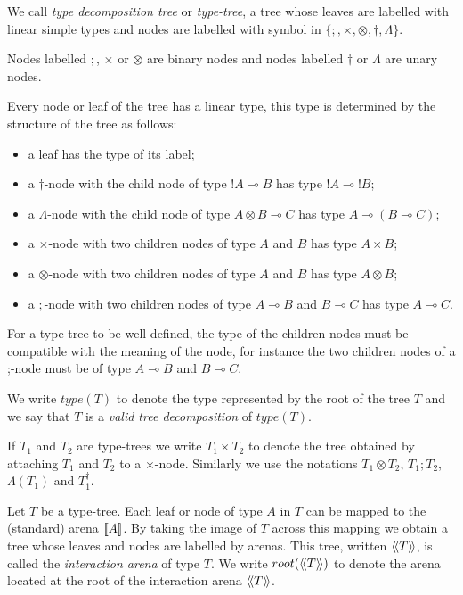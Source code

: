 \begin{dfn}
We call \emph{type decomposition tree} or \emph{type-tree}, a tree whose leaves are labelled with linear simple types
and nodes are labelled with symbol in $\{ ;, \times, \otimes, \dagger, \Lambda \}$.

Nodes labelled $;$, $\times$ or $\otimes$ are binary nodes and nodes labelled $\dagger$ or $\Lambda$ are unary nodes.

Every node or leaf of the tree has a linear type, this type is determined by the
structure of the tree as follows:
\begin{itemize}
\item a leaf has the type of its label;

\item a $\dagger$-node with the child node of type $!A \multimap B$ has type $!A \multimap !B$;

\item a $\Lambda$-node with the child node of type $A \otimes B \multimap C$ has type $A \multimap (B \multimap C)$;

\item a $\times$-node with two children nodes of type $A$
and $B$ has type $A \times B$;

\item a $\otimes$-node with two children nodes of type $A$
and $B$ has type $A\otimes B$;

\item a $;$-node with two children nodes of type $A\multimap B$
and $B \multimap C$ has type $A \multimap C$.
\end{itemize}

For a type-tree to be well-defined, the type of the children nodes
must be compatible with the meaning of the node, for instance the
two children nodes of a ;-node must be of type
$A\multimap B$ and $B\multimap C$.

We write $type(T)$ to denote the type represented by the root of the tree $T$ and we say that $T$ is a \emph{valid tree decomposition} of $type(T)$.

If $T_1$ and $T_2$ are type-trees we write $T_1 \times T_2$ to denote the tree obtained by attaching $T_1$ and $T_2$ to a $\times$-node.
Similarly we use the notations $T_1 \otimes T_2$, $T_1 ; T_2$, $\Lambda(T_1)$ and  $T_1^\dagger$.
\end{dfn}


Let $T$ be a type-tree. Each leaf or node of type $A$ in $T$ can be mapped to the
(standard) arena ${[\![ A ]\!]}$. By taking the image of $T$ across this mapping we obtain a tree whose leaves and nodes are labelled by arenas.
This tree, written ${\langle\!\langle T \rangle\!\rangle}$, is called the \emph{interaction arena} of type $T$.
We write $root({\langle\!\langle T \rangle\!\rangle})$ to denote the arena located at the root of the interaction arena ${\langle\!\langle T \rangle\!\rangle}$.


